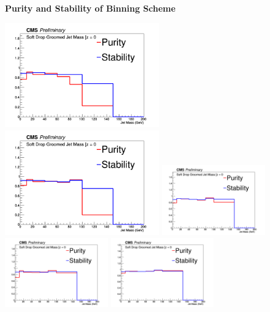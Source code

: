 \documentclass{beamer}
\begin{document}
\begin{frame}{\textbf{Purity and Stability of Binning Scheme}}



\includegraphics[width=0.5\textwidth]{Jun25_unfoldPlots_sdB0/PurityandStability_200_260.png}%
\includegraphics[width=0.5\textwidth]{Jun25_unfoldPlots_sdB0/PurityandStability_260_350.png}
\newline
\includegraphics[width=0.3333\textwidth]{Jun25_unfoldPlots_sdB0/PurityandStability_350_460.png}%
\includegraphics[width=0.3333\textwidth]{Jun25_unfoldPlots_sdB0/PurityandStability_460_550.png}
\includegraphics[width=0.3333\textwidth]{Jun25_unfoldPlots_sdB0/PurityandStability_550_13000.png}




\end{frame}
\end{document}
